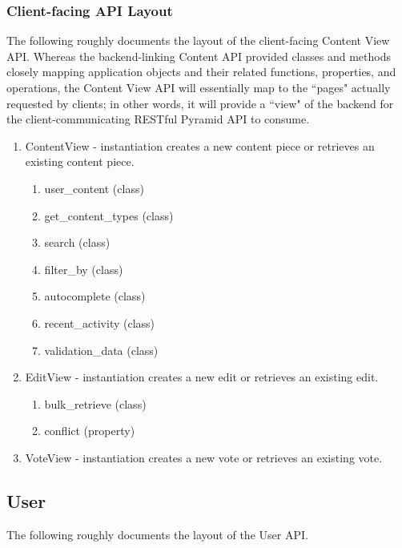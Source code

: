 \documentclass[12pt,letterpaper]{article}
\begin{document}
\subsubsection{Client-facing API Layout}

The following roughly documents the layout of the client-facing Content View API. Whereas the backend-linking Content API provided classes and methods closely mapping application objects and their related functions, properties, and operations, the Content View API will essentially map to the ``pages" actually requested by clients; in other words, it will provide a ``view" of the backend for the client-communicating RESTful Pyramid API to consume. 

\begin{enumerate}
\item[] ContentView - instantiation creates a new content piece or retrieves an existing content piece.
\begin{enumerate}
\item[] user\_content (class)
\item[] get\_content\_types (class)
\item[] search (class)
\item[] filter\_by (class)
\item[] autocomplete (class)
\item[] recent\_activity (class)
\item[] validation\_data (class)
\end{enumerate}
\item[] EditView - instantiation creates a new edit or retrieves an existing edit.
\begin{enumerate}
\item[] bulk\_retrieve (class)
\item[] conflict (property)
\end{enumerate}
\item[] VoteView - instantiation creates a new vote or retrieves an existing vote.
\end{enumerate}



\subsection{User}

The following roughly documents the layout of the User API.
\end{document}
